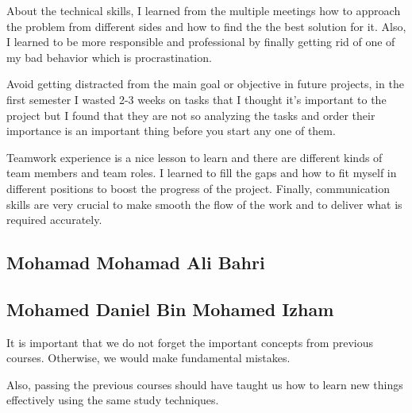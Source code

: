 \documentclass[../main.tex]{subfiles}
\begin{document}
About the technical skills, I learned from the multiple meetings how to 
approach the problem from different sides and how to find the 
the best solution for it. Also, I learned to be more responsible
and professional by finally getting rid of one of my bad behavior 
which is procrastination.

Avoid getting distracted from the main goal or objective in 
future projects, in the first semester I wasted 2-3 weeks 
on tasks that I thought it's important to the project but 
I found that they are not so analyzing the tasks and 
order their importance is an important thing before
you start any one of them.

Teamwork experience is a nice lesson to learn and 
there are different kinds of team members and team roles.
I learned to fill the gaps and how to fit myself in different 
positions to boost the progress of the project. 
Finally, communication skills are very crucial to make smooth 
the flow of the work and to deliver what is required accurately.

\subsection{Mohamad Mohamad Ali Bahri}

\lipsum[2]

\subsection{Mohamed Daniel Bin Mohamed Izham}

It is important that we do not forget the important concepts from
previous courses.
Otherwise, we would make fundamental mistakes.

Also, passing the previous courses should have taught us how to learn
new things effectively using the same study techniques.
\end{document}
